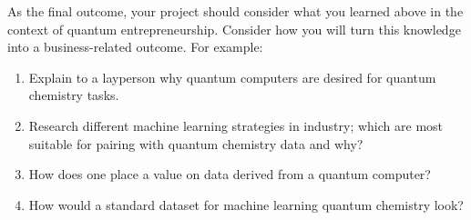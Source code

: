\documentclass[12pt]{article}
\begin{document}
As the final outcome, your project should consider what you learned above in the context of quantum entrepreneurship.  Consider how you will turn this knowledge into a business-related outcome.  For example:
\begin{enumerate}
\item Explain to a layperson why quantum computers are desired for quantum chemistry tasks.
\item Research different machine learning strategies in industry; which are most suitable for pairing with quantum chemistry data and why?
\item How does one place a value on data derived from a quantum computer?
\item How would a standard dataset for machine learning quantum chemistry look?
\end{enumerate}





\end{document}
